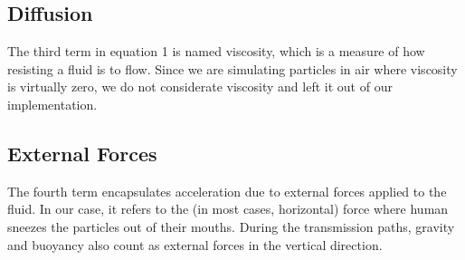 \documentclass[sigconf]{acmart}
\begin{document}
\subsection{Diffusion}
The third term in equation 1 is named viscosity, which is a measure of how resisting a fluid is to flow. Since we are simulating particles in air where viscosity is virtually zero, we do not considerate viscosity and left it out of our implementation. 

\subsection{External Forces}
The fourth term encapsulates acceleration due to external forces applied to the fluid. In our case, it refers to the (in most cases, horizontal) force where human sneezes the particles out of their mouths. During the transmission paths, gravity and buoyancy also count as external forces in the vertical direction. 
\end{document}
